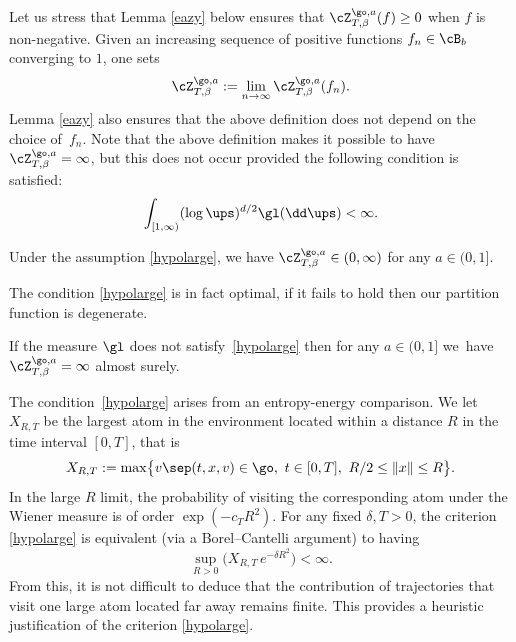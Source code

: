 Let us stress that Lemma \ref{eazy} below ensures that $\cZ^{\go,a}_{T,\beta}(f)\ge0$ when $f$ is non-negative.
Given an increasing sequence of positive functions $f_n \in \cB_b$ converging to $1$, one sets
\begin{equation}
\label{def:Zmonotone}
\cZ^{\go,a}_{T,\beta}:= \lim_{n\to \infty}\cZ^{\go,a}_{T,\beta}(f_n).
\end{equation}
Lemma \ref{eazy} also ensures that the above definition does not depend on the choice of~$f_n$.
Note that the above definition makes it possible to have $\cZ^{\go,a}_{T,\beta}=\infty$, but this
does not occur provided the following condition is satisfied:
\begin{equation}\label{hypolarge}
\int_{[1,\infty)} (\log \ups)^{d/2} \gl(\dd \ups)<\infty.
\end{equation}

\begin{proposition}
\label{prop:Zfinite}
Under the assumption \eqref{hypolarge},
we have $ \cZ^{\go,a}_{T,\beta} \in (0,\infty)$
for any $a\in (0,1]$.
\end{proposition}
 The condition \eqref{hypolarge} is in fact optimal, if it fails to hold then our partition function is degenerate.
\begin{proposition}\label{prop:toinfinity}
If the measure $\gl$ does not satisfy~\eqref{hypolarge} then for any $a\in(0,1]$
we~have $\cZ^{\go,a}_{T,\beta}=\infty$ almost surely.
\end{proposition}

\begin{rem}
The condition~\eqref{hypolarge} arises from an entropy-energy comparison. We let~$X_{R,T}$ be the largest atom in the environment located within a distance $R$ in the time interval $[0,T]$, that is
\[
X_{R,T}:= \max\bigl\{ v \sep (t,x,v)\in \go, \ t\in [0,T], \ R/2 \le \|x\|\le R \big \}.
\]
In the large $R$ limit, the probability of visiting the corresponding atom under the Wiener measure is of order $\exp(-c_T R^2)$. For any fixed $\delta, T>0$, the criterion \eqref{hypolarge} is equivalent (via a Borel--Cantelli argument) to having
\[
\sup_{R>0} \bigl(X_{R,T} \, e^{-\delta R^2} \bigr)<\infty.
\]
From this, it is not difficult to deduce that the contribution of trajectories that visit one large atom located far away remains finite. This provides a heuristic justification of the criterion \eqref{hypolarge}.
\end{rem}

